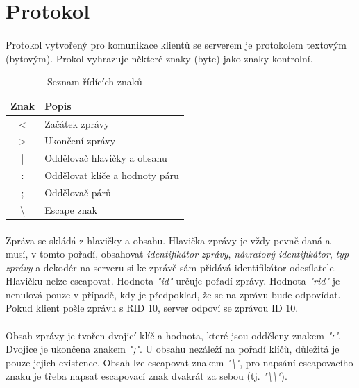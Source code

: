 \documentclass[12pt, a4paper]{article}
\begin{document}
\newpage
\section{Protokol}
\paragraph{}
Protokol vytvořený pro komunikace klientů se serverem je protokolem textovým (bytovým). Prokol vyhrazuje některé
znaky (byte) jako znaky kontrolní.

    \begin{table}[H]
        \centering
        \begin{tabular}{|c|l|}
            \hline
            Znak & Popis \\
            \hline
            \hline
            < & Začátek zprávy \\
            \hline
            > & Ukončení zprávy \\
            \hline
            | & Oddělovač hlavičky a obsahu \\
            \hline
            : & Oddělovat klíče a hodnoty páru \\
            \hline
            ; & Oddělovač párů \\
            \hline
            \textbackslash & Escape znak \\
            \hline
        \end{tabular}
        \caption{Seznam řídících znaků}
    \end{table}

\paragraph{}
Zpráva se skládá z hlavičky a obsahu. Hlavička zprávy je vždy pevně daná a musí, v tomto pořadí, obsahovat
\textit{identifikátor zprávy}, \textit{návratový identifikátor}, \textit{typ zprávy} a dekodér na serveru si ke
zprávě sám přidává identifikátor odesílatele. Hlavičku nelze escapovat. Hodnota \textit{"id"} určuje pořadí zprávy.
Hodnota \textit{"rid"} je nenulová pouze v případě, kdy je předpoklad, že se na zprávu bude odpovídat. Pokud klient
pošle zprávu s RID 10, server odpoví se zprávou ID 10.

\paragraph{}
Obsah zprávy je tvořen dvojicí klíč a hodnota, které jsou odděleny znakem \textit{":"}. Dvojice je ukončena znakem
\textit{";"}. U obsahu nezáleží na pořadí klíčů, důležitá je pouze jejich existence. Obsah lze escapovat znakem
\textit{"\textbackslash"}, pro napsání escapovacího znaku je třeba napsat escapovací znak dvakrát za sebou (tj.
\textit{"\textbackslash\textbackslash"}).
\end{document}
